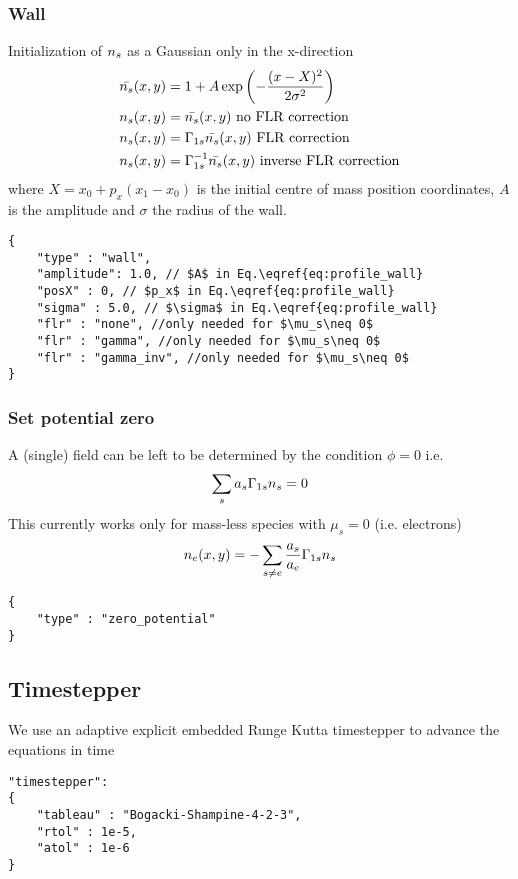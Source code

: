 \subsubsection{Wall}
Initialization of ${n_s} $ as a Gaussian only in the x-direction
\begin{align} \label{eq:profile_wall}
    \bar {{n_s} }(x,y) &= 1 + A\exp\left( -\frac{(x-X)^2 }{2\sigma^2}\right) \\
    {n_s} (x,y) &= \bar {{n_s} }(x,y) \text{ no FLR correction} \\
    {n_s} (x,y) &= \Gamma_{1s}\bar {{n_s} }(x,y) \text{ FLR correction} \\
    {n_s} (x,y) &= \Gamma_{1s}^{-1}\bar {{n_s} }(x,y) \text{ inverse FLR correction} \\
\end{align}
where $X = x_0 + p_x (x_1 - x_0)$ is the initial centre of mass position coordinates, $A$ is the amplitude and $\sigma$ the
radius of the wall.
\begin{verbatim}
{
    "type" : "wall",
    "amplitude": 1.0, // $A$ in Eq.\eqref{eq:profile_wall}
    "posX" : 0, // $p_x$ in Eq.\eqref{eq:profile_wall}
    "sigma" : 5.0, // $\sigma$ in Eq.\eqref{eq:profile_wall}
    "flr" : "none", //only needed for $\mu_s\neq 0$
    "flr" : "gamma", //only needed for $\mu_s\neq 0$
    "flr" : "gamma_inv", //only needed for $\mu_s\neq 0$
}
\end{verbatim}

\subsubsection{ Set potential zero}
A (single) field can be left to be determined by the condition $\phi = 0$ i.e.
\begin{align}
    \sum_s a_s \Gamma_{1s} {n_s}  = 0
\end{align}
This currently works only for mass-less species with $\mu_s =0$ (i.e. electrons)
\begin{align}
    n_e(x,y) = -\sum_{s\neq e} \frac{a_s}{a_e} \Gamma_{1s}{n_s} 
\end{align}
\begin{verbatim}
{
    "type" : "zero_potential"
}
\end{verbatim}
\subsection{Timestepper}
We use an adaptive explicit embedded Runge Kutta timestepper to advance the equations in time
\begin{verbatim}
"timestepper":
{
    "tableau" : "Bogacki-Shampine-4-2-3",
    "rtol" : 1e-5,
    "atol" : 1e-6
}
\end{verbatim}



